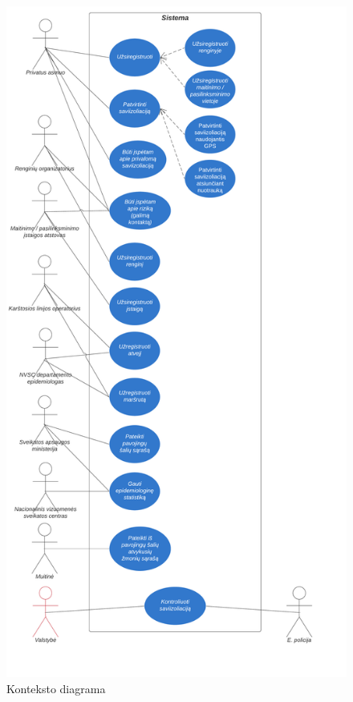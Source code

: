 \documentclass{VUMIFPSkursinis}
\begin{document}
\begin{figure}[H]
    \centering
    \includegraphics[scale=0.6]{img/use_case_diagram.png}
    \caption{Konteksto diagrama}
    \label{img:use_case_diagram}
\end{figure}
\end{document}
